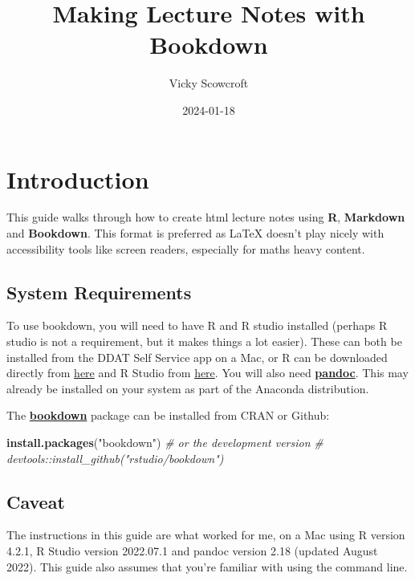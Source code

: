 \documentclass[
]{book}
\title{Making Lecture Notes with Bookdown}
\author{Vicky Scowcroft}
\date{2024-01-18}
\newenvironment{Shaded}{\begin{snugshade}}{\end{snugshade}}
\newcommand{\CommentTok}[1]{\textcolor[rgb]{0.56,0.35,0.01}{\textit{#1}}}
\newcommand{\FunctionTok}[1]{\textcolor[rgb]{0.13,0.29,0.53}{\textbf{#1}}}
\newcommand{\NormalTok}[1]{#1}
\newcommand{\StringTok}[1]{\textcolor[rgb]{0.31,0.60,0.02}{#1}}
\begin{document}
\maketitle

{
\setcounter{tocdepth}{1}
\tableofcontents
}
\chapter*{Introduction}\label{introduction}

This guide walks through how to create html lecture notes using \textbf{R}, \textbf{Markdown} and \textbf{Bookdown}. This format is preferred as LaTeX doesn't play nicely with accessibility tools like screen readers, especially for maths heavy content.

\section*{System Requirements}\label{system-requirements}

To use bookdown, you will need to have R and R studio installed (perhaps R studio is not a requirement, but it makes things a lot easier). These can both be installed from the DDAT Self Service app on a Mac, or R can be downloaded directly from \href{https://cran.r-project.org/}{here} and R Studio from \href{https://rstudio.com/products/rstudio/download/}{here}. You will also need \href{https://pandoc.org/index.html}{\textbf{pandoc}}. This may already be installed on your system as part of the Anaconda distribution.

The \href{https://bookdown.org/yihui/bookdown/}{\textbf{bookdown}} package can be installed from CRAN or Github:

\begin{Shaded}
\begin{Highlighting}[]
\FunctionTok{install.packages}\NormalTok{(}\StringTok{"bookdown"}\NormalTok{)}
\CommentTok{\# or the development version}
\CommentTok{\# devtools::install\_github("rstudio/bookdown")}
\end{Highlighting}
\end{Shaded}

\section*{Caveat}\label{caveat}

The instructions in this guide are what worked for me, on a Mac using R version 4.2.1, R Studio version 2022.07.1 and pandoc version 2.18 (updated August 2022). This guide also assumes that you're familiar with using the command line.
\end{document}
